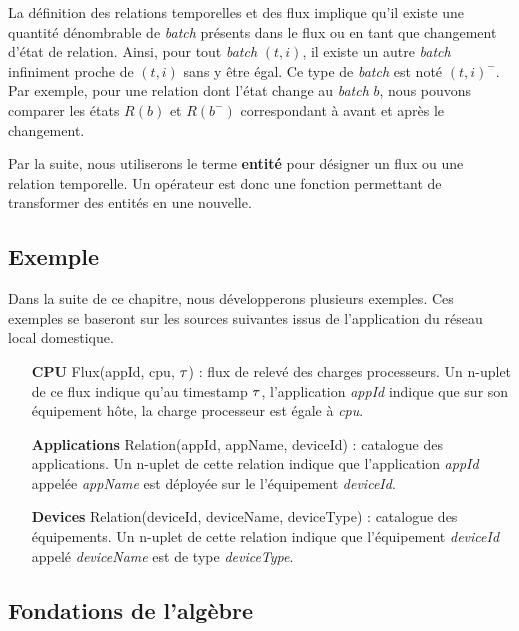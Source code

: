 La définition des relations temporelles et des flux implique qu'il existe une quantité dénombrable de \textit{batch} présents dans le flux ou en tant que changement d'état de relation. Ainsi, pour tout \textit{batch} $(t,i)$, il existe un autre \textit{batch} infiniment proche de $(t,i)$ sans y être égal. Ce type de \textit{batch} est noté $(t,i)^-$. Par exemple, pour une relation dont l'état change au \textit{batch} $b$, nous pouvons comparer les états $R(b)$ et $R(b^-)$ correspondant à avant et après le changement.

Par la suite, nous utiliserons le terme \textbf{entité} pour désigner un flux ou une relation temporelle. Un opérateur est donc une fonction permettant de transformer des entités en une nouvelle.
\subsection{Exemple}
Dans la suite de ce chapitre, nous développerons plusieurs exemples. Ces exemples se baseront sur les sources suivantes issus de l'application du réseau local domestique.
\begin{itemize}
    \item[\textbf{CPU}] Flux(appId, cpu, $\tau$) : flux de relevé des charges processeurs. Un n-uplet de ce flux indique qu'au timestamp $\tau$, l'application \textit{appId} indique que sur son équipement hôte, la charge processeur est égale à \textit{cpu}.
    \item[\textbf{Applications}] Relation(appId, appName, deviceId) : catalogue des applications. Un n-uplet de cette relation indique que l'application \textit{appId} appelée \textit{appName} est déployée sur le l'équipement \textit{deviceId}.
    \item[\textbf{Devices}] Relation(deviceId, deviceName, deviceType) : catalogue des équipements. Un n-uplet de cette relation indique que l'équipement \textit{deviceId} appelé \textit{deviceName} est de type \textit{deviceType}.
\end{itemize}

\subsection{Fondations de l'algèbre}
